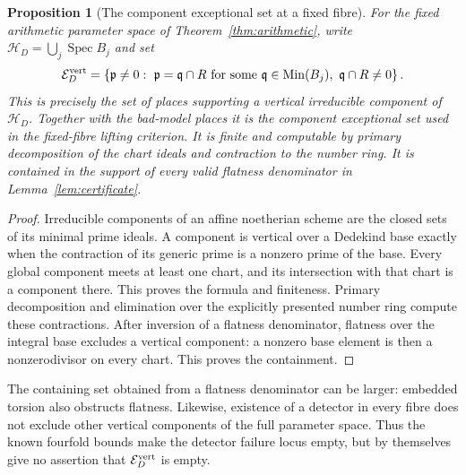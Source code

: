 \documentclass[11pt]{article}
\newtheorem{proposition}[theorem]{Proposition}
\theoremstyle{definition}
\theoremstyle{remark}
\newcommand{\Spec}{\operatorname{Spec}}
\begin{document}
\begin{proposition}[The component exceptional set at a fixed fibre]
\label{prop:exact-exceptional}
For the fixed arithmetic parameter space of
Theorem~\ref{thm:arithmetic}, write
$\mathscr H_D=\bigcup_j\Spec B_j$ and set
\[
 \mathcal E_D^{\rm vert}
 =\left\{\mathfrak p\ne0:\ \mathfrak p=
           \mathfrak q\cap R\text{ for some }
           \mathfrak q\in\operatorname{Min}(B_j),
           \ \mathfrak q\cap R\ne0\right\}.
\]
This is precisely the set of places supporting a vertical
irreducible component of $\mathscr H_D$.
Together with the bad-model places it is the component
exceptional set used in the fixed-fibre lifting criterion.
It is finite and computable by primary decomposition of the
chart ideals and contraction to the number ring.
It is contained in the support of every valid flatness
denominator in Lemma~\ref{lem:certificate}.
\end{proposition}
\begin{proof}
Irreducible components of an affine noetherian scheme are the
closed sets of its minimal prime ideals.  A component is
vertical over a Dedekind base exactly when the contraction of
its generic prime is a nonzero prime of the base.  Every global
component meets at least one chart, and its intersection with
that chart is a component there.  This proves the formula
and finiteness.  Primary decomposition and elimination over
the explicitly presented number ring compute these
contractions.  After inversion of a flatness denominator,
flatness over the integral base excludes a vertical component:
a nonzero base element is then a nonzerodivisor on every chart.
This proves the containment.
\end{proof}

The containing set obtained from a flatness denominator can
be larger: embedded torsion also obstructs flatness.
Likewise, existence of a detector in every fibre does not
exclude other vertical components of the full parameter
space.  Thus the known fourfold bounds make the detector
failure locus empty, but by themselves give no assertion that
$\mathcal E_D^{\rm vert}$ is empty.
\end{document}
